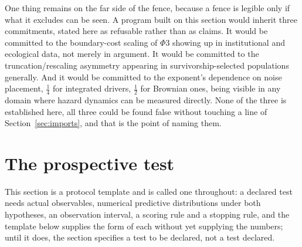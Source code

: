 One thing remains on the far side of the fence, because a fence is
legible only if what it excludes can be seen. A program built on this
section would inherit three commitments, stated here as refusable rather
than as claims. It would be committed to the boundary-cost scaling of
$\Phi3$ showing up in institutional and ecological data, not merely in
argument. It would be committed to the truncation/rescaling asymmetry
appearing in survivorship-selected populations generally. And it would
be committed to the exponent's dependence on noise placement, $\tfrac14$
for integrated drivers, $\tfrac12$ for Brownian ones, being visible
in any domain where hazard dynamics can be measured directly. None of
the three is established here, all three could be found false without
touching a line of Section~\ref{sec:imports}, and that is the
point of naming them.


\section{The prospective test}\label{sec:protocol}

\noindent This section is a protocol template and is called one throughout: a declared test needs actual observables, numerical predictive distributions under both hypotheses, an observation interval, a scoring rule and a stopping rule, and the template below supplies the form of each without yet supplying the numbers; until it does, the section specifies a test to be declared, not a test declared.

